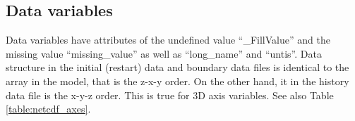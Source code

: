 \subsection{Data variables}
Data variables have attributes of the undefined value ``\_FillValue'' and 
the missing value ``missing\_value'' as well as ``long\_name'' and ``untis''.
Data structure in the initial (restart) data and boundary data files 
is identical to the array in the model, that is the z-x-y order.
On the other hand, it in the history data file is the x-y-z order.
This is true for 3D axis variables.
See also Table \ref{table:netcdf_axes}.

